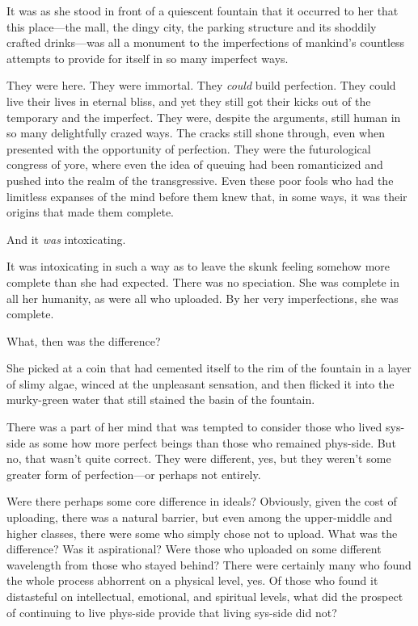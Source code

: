 It was as she stood in front of a quiescent fountain that it occurred to her that this place---the mall, the dingy city, the parking structure and its shoddily crafted drinks---was all a monument to the imperfections of mankind's countless attempts to provide for itself in so many imperfect ways.

They were here. They were immortal. They \emph{could} build perfection. They could live their lives in eternal bliss, and yet they still got their kicks out of the temporary and the imperfect. They were, despite the arguments, still human in so many delightfully crazed ways. The cracks still shone through, even when presented with the opportunity of perfection. They were the futurological congress of yore, where even the idea of queuing had been romanticized and pushed into the realm of the transgressive. Even these poor fools who had the limitless expanses of the mind before them knew that, in some ways, it was their origins that made them complete.

And it \emph{was} intoxicating.

It was intoxicating in such a way as to leave the skunk feeling somehow more complete than she had expected. There was no speciation. She was complete in all her humanity, as were all who uploaded. By her very imperfections, she was complete.

What, then was the difference?

She picked at a coin that had cemented itself to the rim of the fountain in a layer of slimy algae, winced at the unpleasant sensation, and then flicked it into the murky-green water that still stained the basin of the fountain.

There was a part of her mind that was tempted to consider those who lived sys-side as some how more perfect beings than those who remained phys-side. But no, that wasn't quite correct. They were different, yes, but they weren't some greater form of perfection---or perhaps not entirely.

Were there perhaps some core difference in ideals? Obviously, given the cost of uploading, there was a natural barrier, but even among the upper-middle and higher classes, there were some who simply chose not to upload. What was the difference? Was it aspirational? Were those who uploaded on some different wavelength from those who stayed behind? There were certainly many who found the whole process abhorrent on a physical level, yes. Of those who found it distasteful on intellectual, emotional, and spiritual levels, what did the prospect of continuing to live phys-side provide that living sys-side did not?


